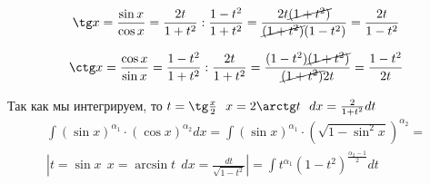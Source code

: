 \[
  \tg x = \frac{\sin x}{\cos x} = \frac{2t}{1+t^2} : \frac{1-t^2}{1+t^2} =
  \frac{2t \cancel{(1+t^2)}}{\cancel{(1+t^2)} (1-t^2)} = \frac{2t}{1-t^2}
\]

\[
  \ctg x = \frac{\cos x}{\sin x} = \frac{1-t^2}{1+t^2} : \frac{2t}{1+t^2} =
  \frac{(1-t^2) \cancel{(1+t^2)}}{\cancel{(1+t^2)} 2t} = \frac{1-t^2}{2t}
\]

Так как мы интегрируем, то $t = \tg \frac{x}{2} ~~ x = 2\arctg t ~~
  dx = \frac{2}{1+t^2}dt$
\begin{eqnarray*}
  \int (\sin x)^{\alpha_1} \cdot (\cos x)^{\alpha_2} dx =
  \int (\sin x)^{\alpha_1} \cdot (\sqrt{1 - \sin^2 x})^{\alpha_2} = \\
  \left| t = \sin x ~~ x = \arcsin t ~~ dx = \frac{dt}{\sqrt{1-t^2}} \right| =
  \int t^{\alpha_1}(1-t^2)^{\frac{\alpha_2 - 1}{2}} dt
\end{eqnarray*}